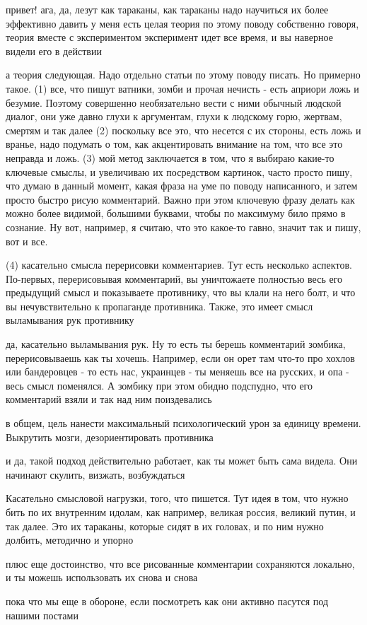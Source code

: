  
 
 
 
 


привет! ага, да, лезут как тараканы, как тараканы
надо научиться их более эффективно давить
у меня есть целая теория по этому поводу
собственно говоря, теория вместе с экспериментом
эксперимент идет все время, и вы наверное видели его в действии

а теория следующая. Надо отдельно статьи по этому поводу писать. Но примерно
такое. (1) все, что пишут ватники, зомби и прочая нечисть - есть априори ложь и
безумие. Поэтому совершенно необязательно вести с ними обычный людской диалог,
они уже давно глухи к аргументам, глухи к людскому горю, жертвам, смертям и так
далее (2) поскольку все это, что несется с их стороны, есть ложь и вранье, надо
подумать о том, как акцентировать внимание на том, что все это неправда и ложь.
(3) мой метод заключается в том, что я выбираю какие-то ключевые смыслы, и
увеличиваю их посредством картинок, часто просто пишу, что думаю в данный
момент, какая фраза на уме по поводу написанного, и затем просто быстро рисую
комментарий. Важно при этом ключевую фразу делать как можно более видимой,
большими буквами, чтобы по максимуму било прямо в сознание. Ну вот, например, я
считаю, что это какое-то гавно, значит так и пишу, вот и все.

(4) касательно смысла перерисовки комментариев. Тут есть несколько аспектов.
По-первых, перерисовывая комментарий, вы уничтожаете полностью весь его
предыдущий смысл и показываете противнику, что вы клали на него болт, и что вы
нечувствительно к пропаганде противника. Также, это имеет смысл выламывания рук
противнику

да, касательно выламывания рук. Ну то есть ты берешь комментарий зомбика,
перерисовываешь как ты хочешь. Например, если он орет там что-то про хохлов или
бандеровцев - то есть нас, украинцев - ты меняешь все на русских, и опа - весь
смысл поменялся. А зомбику при этом обидно подспудно, что его комментарий взяли
и так над ним поиздевались

в общем, цель нанести максимальный психологический урон за единицу времени.
Выкрутить мозги, дезориентировать противника

и да, такой подход действительно работает, как ты может быть сама видела. Они
начинают скулить, визжать, возбуждаться

Касательно смысловой нагрузки, того, что пишется. Тут идея в том, что нужно
бить по их внутренним идолам, как например, великая россия, великий путин, и
так далее. Это их тараканы, которые сидят в их головах, и по ним нужно долбить,
методично и упорно

плюс еще достоинство, что все рисованные комментарии сохраняются локально, и ты
можешь использовать их снова и снова

пока что мы еще в обороне, если посмотреть как они активно пасутся под нашими
постами

